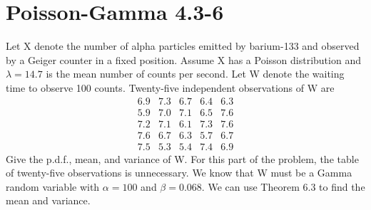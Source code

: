 \documentclass[12pt]{article}
\begin{document}
	\section[20pt]{Poisson-Gamma 4.3-6}
	Let X denote the number of alpha particles emitted by barium-133 and observed by a Geiger counter in a fixed position. Assume X has a Poisson distribution and \(\lambda=14.7\) is the mean number of counts per second. Let W denote the waiting time to observe 100 counts. \newline
	Twenty-five independent observations of W are
	\[\begin{matrix}
	6.9 & 7.3 & 6.7 & 6.4 & 6.3 \\
	5.9 & 7.0 & 7.1 & 6.5 & 7.6 \\
	7.2 & 7.1 & 6.1 & 7.3 & 7.6 \\
	7.6 & 6.7 & 6.3 & 5.7 & 6.7 \\
	7.5 & 5.3 & 5.4 & 7.4 & 6.9
	\end{matrix}\]	
	Give the p.d.f., mean, and variance of W.
	\newline \newline
	For this part of the problem, the table of twenty-five observations is unnecessary. \newline
	We know that W must be a Gamma random variable with \(\alpha=100\) and \(\beta=0.068\). \newline
	We can use Theorem 6.3 to find the mean and variance. \newline \newline
\end{document}

